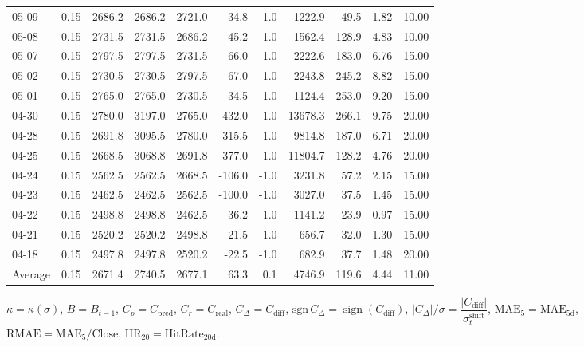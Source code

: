 \begin{threeparttable}
{\begin{tabular}{lrrrrrrrrrr}
05-09 & 0.15 & 2686.2 & 2686.2 & 2721.0 & -34.8 & -1.0 & 1222.9 & 49.5 & 1.82 & 10.00 \\
05-08 & 0.15 & 2731.5 & 2731.5 & 2686.2 & 45.2 & 1.0 & 1562.4 & 128.9 & 4.83 & 10.00 \\
05-07 & 0.15 & 2797.5 & 2797.5 & 2731.5 & 66.0 & 1.0 & 2222.6 & 183.0 & 6.76 & 15.00 \\
05-02 & 0.15 & 2730.5 & 2730.5 & 2797.5 & -67.0 & -1.0 & 2243.8 & 245.2 & 8.82 & 15.00 \\
05-01 & 0.15 & 2765.0 & 2765.0 & 2730.5 & 34.5 & 1.0 & 1124.4 & 253.0 & 9.20 & 15.00 \\
04-30 & 0.15 & 2780.0 & 3197.0 & 2765.0 & 432.0 & 1.0 & 13678.3 & 266.1 & 9.75 & 20.00 \\
04-28 & 0.15 & 2691.8 & 3095.5 & 2780.0 & 315.5 & 1.0 & 9814.8 & 187.0 & 6.71 & 20.00 \\
04-25 & 0.15 & 2668.5 & 3068.8 & 2691.8 & 377.0 & 1.0 & 11804.7 & 128.2 & 4.76 & 20.00 \\
04-24 & 0.15 & 2562.5 & 2562.5 & 2668.5 & -106.0 & -1.0 & 3231.8 & 57.2 & 2.15 & 15.00 \\
04-23 & 0.15 & 2462.5 & 2462.5 & 2562.5 & -100.0 & -1.0 & 3027.0 & 37.5 & 1.45 & 15.00 \\
04-22 & 0.15 & 2498.8 & 2498.8 & 2462.5 & 36.2 & 1.0 & 1141.2 & 23.9 & 0.97 & 15.00 \\
04-21 & 0.15 & 2520.2 & 2520.2 & 2498.8 & 21.5 & 1.0 & 656.7 & 32.0 & 1.30 & 15.00 \\
04-18 & 0.15 & 2497.8 & 2497.8 & 2520.2 & -22.5 & -1.0 & 682.9 & 37.7 & 1.48 & 20.00 \\
Average & 0.15 & 2671.4 & 2740.5 & 2677.1 & 63.3 & 0.1 & 4746.9 & 119.6 & 4.44 & 11.00 \\
\bottomrule
\end{tabular}
}%
\begin{tablenotes}\footnotesize
\item $\kappa=\kappa(\sigma)$, $B=B_{t-1}$, $C_p=C_{\text{pred}}$, $C_r=C_{\text{real}}$, $C_\Delta=C_{\text{diff}}$, $\mathrm{sgn}\,C_\Delta=\operatorname{sign}(C_{\text{diff}})$, $|C_\Delta|/\sigma=\dfrac{|C_{\text{diff}}|}{\sigma_t^{\text{shift}}}$, $\mathrm{MAE}_5=\mathrm{MAE}_{5\text{d}}$, $\mathrm{RMAE}= \mathrm{MAE}_5 / \text{Close}$, $\mathrm{HR}_{20}=\mathrm{HitRate}_{20\text{d}}$.
\end{tablenotes}
\end{threeparttable}
\endgroup